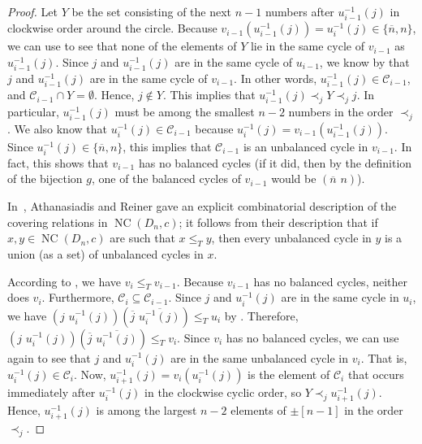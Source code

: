 \documentclass[ALCO,ThmDefs,Unicode,epreuves]{cedram}
\DeclareMathOperator{\NC}{NC}
\begin{document}
\begin{proof}
Let $Y$ be the set consisting of the next $n-1$ numbers after $u_{i-1}^{-1}(j)$ in clockwise order around the circle. Because $v_{i-1}(u_{i-1}^{-1}(j))=u_i^{-1}(j)\in\{\overline n,n\}$, we can use  to see that none of the elements of $Y$ lie in the same cycle of $v_{i-1}$ as $u_{i-1}^{-1}(j)$. Since $j$ and $u_{i-1}^{-1}(j)$ are in the same cycle of $u_{i-1}$, we know by  that $j$ and $u_{i-1}^{-1}(j)$ are in the same cycle of $v_{i-1}$. In other words, $u_{i-1}^{-1}(j)\in\mathcal C_{i-1}$, and $\mathcal C_{i-1}\cap Y=\emptyset$. Hence, $j\not\in Y$. This implies that $u_{i-1}^{-1}(j)\prec_j Y\prec_j j$. In particular, $u_{i-1}^{-1}(j)$ must be among the smallest $n-2$ numbers in the order $\prec_j$. We also know that $u_i^{-1}(j)\in\mathcal C_{i-1}$ because $u_i^{-1}(j)=v_{i-1}(u_{i-1}^{-1}(j))$. Since $u_i^{-1}(j)\in\{\overline n,n\}$, this implies that $\mathcal C_{i-1}$ is an unbalanced cycle in $v_{i-1}$. In fact, this shows that $v_{i-1}$ has no balanced cycles (if it did, then by the definition of the bijection $g$, one of the balanced cycles of $v_{i-1}$ would be $(\overline n\,\, n)$).  

In~\cite{AthanasiadisReiner}, Athanasiadis and Reiner gave an explicit combinatorial description of the covering relations in $\NC(D_n,c)$; it follows from their description that if $x,y\in\NC(D_n,c)$ are such that $x\leq_T y$, then every unbalanced cycle in $y$ is a union (as a set) of unbalanced cycles in $x$.

According to , we have $v_i\leq_T v_{i-1}$. Because $v_{i-1}$ has no balanced cycles, neither does $v_i$. Furthermore, $\mathcal C_i\subseteq \mathcal C_{i-1}$.  Since $j$ and $u_i^{-1}(j)$ are in the same cycle in $u_i$, we have $(j\,\,u_i^{-1}(j))(\overline j\,\,\overline{u_i^{-1}(j)})\leq_T u_i$ by . Therefore, $(j\,\,u_i^{-1}(j))(\overline j\,\,\overline{u_i^{-1}(j)})\leq_T v_i$. Since $v_i$ has no balanced cycles, we can use  again to see that $j$ and $u_i^{-1}(j)$ are in the same unbalanced cycle in $v_i$. That is, $u_i^{-1}(j)\in\mathcal C_i$. Now, $u_{i+1}^{-1}(j)=v_i(u_i^{-1}(j))$ is the element of $\mathcal C_i$ that occurs immediately after $u_i^{-1}(j)$ in the clockwise cyclic order, so $Y\prec_j u_{i+1}^{-1}(j)$. Hence, $u_{i+1}^{-1}(j)$ is among the largest $n-2$ elements of $\pm[n-1]$ in the order $\prec_j$.  


\end{proof}
\end{document}
